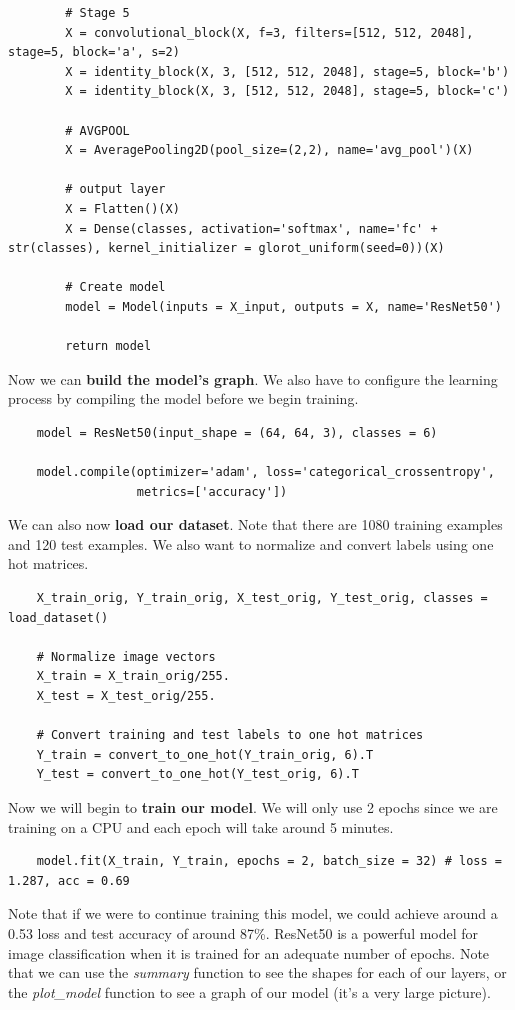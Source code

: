 \documentclass[11pt, a4paper]{article}
\begin{document}
\begin{spacing}{1.1}
\begin{lstlisting}
		# Stage 5 
		X = convolutional_block(X, f=3, filters=[512, 512, 2048], stage=5, block='a', s=2)
		X = identity_block(X, 3, [512, 512, 2048], stage=5, block='b')
		X = identity_block(X, 3, [512, 512, 2048], stage=5, block='c')
		
		# AVGPOOL
		X = AveragePooling2D(pool_size=(2,2), name='avg_pool')(X)
		
		# output layer
		X = Flatten()(X)
		X = Dense(classes, activation='softmax', name='fc' + str(classes), kernel_initializer = glorot_uniform(seed=0))(X)
		
		# Create model
		model = Model(inputs = X_input, outputs = X, name='ResNet50')
		
		return model \end{lstlisting} \vspace*{1mm}
	Now we can \textbf{build the model's graph}. We also have to configure the learning process by compiling the model before we begin training.
	\begin{lstlisting}
	model = ResNet50(input_shape = (64, 64, 3), classes = 6)
	
	model.compile(optimizer='adam', loss='categorical_crossentropy', 
	              metrics=['accuracy'])	\end{lstlisting} \vspace*{1mm}
	We can also now \textbf{load our dataset}. Note that there are 1080 training examples and 120 test examples. We also want to normalize and convert labels using one hot matrices.
	\begin{lstlisting}
	X_train_orig, Y_train_orig, X_test_orig, Y_test_orig, classes = load_dataset()
	
	# Normalize image vectors
	X_train = X_train_orig/255.
	X_test = X_test_orig/255.
	
	# Convert training and test labels to one hot matrices
	Y_train = convert_to_one_hot(Y_train_orig, 6).T
	Y_test = convert_to_one_hot(Y_test_orig, 6).T	\end{lstlisting} \vspace*{1mm}
	Now we will begin to \textbf{train our model}. We will only use 2 epochs since we are training on a CPU and each epoch will take around 5 minutes. 
	\begin{lstlisting}
	model.fit(X_train, Y_train, epochs = 2, batch_size = 32) # loss = 1.287, acc = 0.69 \end{lstlisting} \vspace*{1mm}
	Note that if we were to continue training this model, we could achieve around a 0.53 loss and test accuracy of around 87\%. ResNet50 is a powerful model for image classification when it is trained for an adequate number of epochs. Note that we can use the \textit{summary} function to see the shapes for each of our layers, or the \textit{plot\_model} function to see a graph of our model (it's a very large picture). \newpage


\end{spacing}
\end{document}
